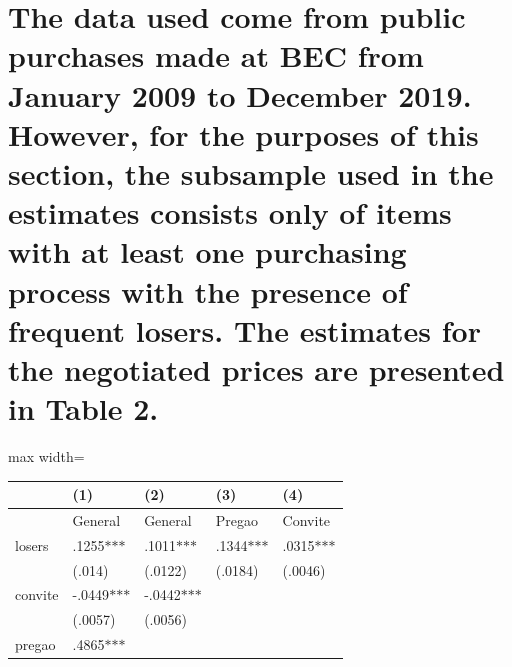 \section{The data used come from public purchases made at BEC from January 2009 to December 2019. However, for the purposes of this section, the subsample used in the estimates consists only of items with at least one purchasing process with the presence of frequent losers. The estimates for the negotiated prices are presented in Table 2.}

\begin{table}[H]
\begin{adjustbox}{max width=\textwidth}
\begin{tabular}{p{3.92cm}p{2.57cm}p{2.5cm}p{2.5cm}p{2.5cm}}
\hline
\multicolumn{1}{|p{5.3cm}}{} &
\multicolumn{1}{|p{3.14cm}}{\centering
 (1)} &
\multicolumn{1}{|p{3.02cm}}{\centering
 (2)} &
\multicolumn{1}{|p{3.02cm}}{\centering
 (3)} &
\multicolumn{1}{|p{3.02cm}|}{\centering
 (4)} \\
\hline
\multicolumn{1}{|p{5.3cm}}{} &
\multicolumn{1}{|p{3.14cm}}{\centering
    General} &
\multicolumn{1}{|p{3.02cm}}{\centering
    General} &
\multicolumn{1}{|p{3.02cm}}{\centering
 Pregao} &
\multicolumn{1}{|p{3.02cm}|}{\centering
    Convite} \\
\hline
\multicolumn{1}{|p{5.3cm}}{ losers} &
\multicolumn{1}{|p{3.14cm}}{\centering
.1255$\ast$$\ast$$\ast$} &
\multicolumn{1}{|p{3.02cm}}{\centering
.1011$\ast$$\ast$$\ast$} &
\multicolumn{1}{|p{3.02cm}}{\centering
.1344$\ast$$\ast$$\ast$} &
\multicolumn{1}{|p{3.02cm}|}{\centering
.0315$\ast$$\ast$$\ast$} \\
\hline
\multicolumn{1}{|p{5.3cm}}{} &
\multicolumn{1}{|p{3.14cm}}{\centering
(.014)} &
\multicolumn{1}{|p{3.02cm}}{\centering
(.0122)} &
\multicolumn{1}{|p{3.02cm}}{\centering
(.0184)} &
\multicolumn{1}{|p{3.02cm}|}{\centering
(.0046)} \\
\hline
\multicolumn{1}{|p{5.3cm}}{ convite} &
\multicolumn{1}{|p{3.14cm}}{\centering
-.0449$\ast$$\ast$$\ast$} &
\multicolumn{1}{|p{3.02cm}}{\centering
-.0442$\ast$$\ast$$\ast$} &
\multicolumn{1}{|p{3.02cm}}{} &
\multicolumn{1}{|p{3.02cm}|}{} \\
\hline
\multicolumn{1}{|p{5.3cm}}{} &
\multicolumn{1}{|p{3.14cm}}{\centering
(.0057)} &
\multicolumn{1}{|p{3.02cm}}{\centering
(.0056)} &
\multicolumn{1}{|p{3.02cm}}{} &
\multicolumn{1}{|p{3.02cm}|}{} \\
\hline
\multicolumn{1}{|p{5.3cm}}{ pregao} &
\multicolumn{1}{|p{3.14cm}}{\centering
.4865$\ast$$\ast$$\ast$} &

\end{tabular}
\end{adjustbox}
\end{table}
